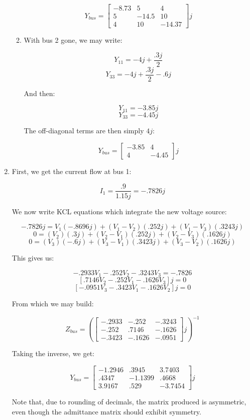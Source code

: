 \begin{enumerate}
\begin{enumerate}
        $$\boxed{Y_{bus}=\left[ \begin{matrix}-8.73 & 5 & 4\\ 5 & -14.5 & 10\\ 4 & 10 & -14.37 \end{matrix} \right]j}$$

      \item With bus 2 gone, we may write:

        $$Y_{11}=-4j+\frac{.3j}{2}$$
        $$Y_{33}=-4j+\frac{.3j}{2}-.6j$$

        And then:

        $$Y_{11}=-3.85j$$
        $$Y_{33}=-4.45j$$

        The off-diagonal terms are then simply $4j$:

        $$\boxed{Y_{bus}=\left[ \begin{matrix} -3.85 & 4\\ 4 & -4.45 \end{matrix}\right]j}$$

    \end{enumerate}

  \item First, we get the current flow at bus 1:

    $$I_1=\frac{.9}{1.15j}=-.7826j$$

    We now write KCL equations which integrate the new voltage source:

    $$-.7826j=V_1(-.8696j) + (V_1-V_2)(.252j)+(V_1-V_3)(.3243j)$$
    $$0=(V_2)(.3j)+(V_2-V_1)(.252j)+(V_2-V_3)(.1626j)$$
    $$0=(V_3)(-.6j)+(V_3-V_1)(.3423j)+(V_3-V_2)(.1626j)$$

    This gives us:

    $$-.2933V_1-.252V_2-.3243V_3=-.7826$$
    $$[.7146V_2-.252V_1-.1626V_3]j=0$$
    $$[-.0951V_3-.3423V_1-.1626V_2]j=0$$

    From which we may build:

    $$Z_{bus}=\left( \left[ \begin{matrix} -.2933 & -.252 & -.3243\\ -.252 & .7146 & -.1626\\ -.3423 & -.1626 & -.0951\end{matrix}\right]j \right)^{-1}$$

    Taking the inverse, we get:

    $$\boxed{Y_{bus}=\left[ \begin{matrix} -1.2946 & .3945 & 3.7403\\ .4347 & -1.1399 & .4668\\ 3.9167 & .529 & -3.7454 \end{matrix} \right]j}$$

    Note that, due to rounding of decimals, the matrix produced is asymmetric, even though the admittance matrix should exhibit symmetry.

\end{enumerate}



